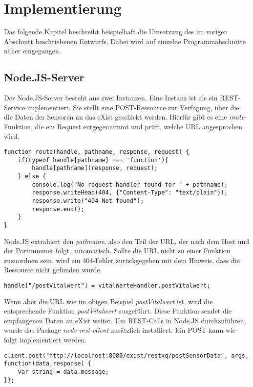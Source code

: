 \section{Implementierung}
Das folgende Kapitel beschreibt beispielhaft die Umsetzung des im vorigen Abschnitt beschriebenen Entwurfs. Dabei wird auf einzelne Programmabschnitte näher eingegangen.

\subsection{Node.JS-Server}
Der Node.JS-Server besteht aus zwei Instanzen. Eine Instanz ist als ein REST-Service implementiert. Sie stellt eine POST-Ressource zur Verfügung, über die die Daten der Sensoren an das eXist geschickt werden. Hierfür gibt es eine \textit{route}-Funktion, die ein Request entgegennimmt und prüft, welche URL angesprochen wird. 

\begin{lstlisting}
function route(handle, pathname, response, request) {
    if(typeof handle[pathname] === 'function'){
        handle[pathname](response, request);
    } else {
        console.log("No request handler found for " + pathname);
        response.writeHead(404, {"Content-Type": "text/plain"});
        response.write("404 Not found");
        response.end();
    }
}
\end{lstlisting}

Node.JS extrahiert den \textit{pathname}, also den Teil der URL, der nach dem Host und der Portnummer folgt, automatisch. Sollte die URL nicht zu einer Funktion zuzuordnen sein, wird ein 404-Fehler zurückgegeben mit dem Hinweis, dass die Ressource nicht gefunden wurde.

\begin{lstlisting}
handle["/postVitalwert"] = vitalWerteHandler.postVitalwert;
\end{lstlisting}

Wenn aber die URL wie im obigen Beispiel \textit{postVitalwert} ist, wird die entsprechende Funktion \textit{postVitalwert} ausgeführt. Diese Funktion sendet die empfangenen Daten an eXist weiter. Um REST-Calls in Node.JS durchzuführen, wurde das Package \textit{node-rest-client} zusätzlich installiert. Ein POST kann wie folgt implementiert werden.

\begin{lstlisting}
client.post("http://localhost:8080/exist/restxq/postSensorData", args, function(data,response) {
    var string = data.message;
});
\end{lstlisting}

